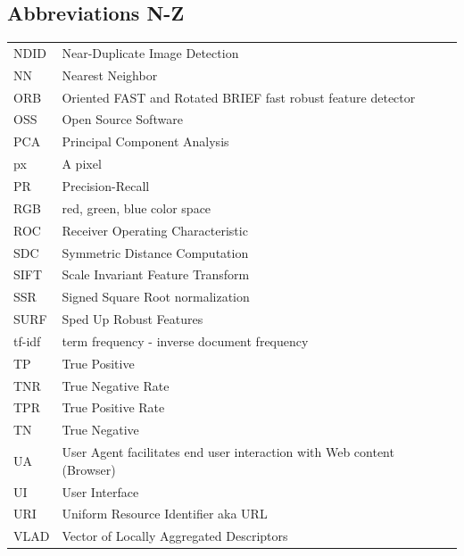 \documentclass[english,12pt,a4paper,pdftex,elec,utf8, table]{aaltothesis}
\begin{document}
\clearpage
\subsection*{Abbreviations N-Z}
\begin{tabular}{ll}
NDID & Near-Duplicate Image Detection\\
  NN & Nearest Neighbor\\
  ORB & Oriented FAST and Rotated BRIEF fast robust feature detector\\
  OSS & Open Source Software\\
  PCA & Principal Component Analysis\\
  px & A pixel  \\
  PR & Precision-Recall\\
  RGB & red, green, blue color space\\
  ROC & Receiver Operating Characteristic\\
  SDC & Symmetric Distance Computation\\
  SIFT & Scale Invariant Feature Transform \\
  SSR & Signed Square Root normalization\\
  SURF & Sped Up Robust Features \\
  tf-idf & term frequency - inverse document frequency\\
  TP & True Positive\\
  TNR & True Negative Rate\\
  TPR & True Positive Rate\\
  TN & True Negative\\
  UA   & User Agent facilitates end user interaction with Web content (Browser)\\
  UI   & User Interface\\
  URI  & Uniform Resource Identifier aka URL\\
  VLAD & Vector of Locally Aggregated Descriptors\\
\end{tabular}
\cleardoublepage
\storeinipagenumber
{}
\setcounter{page}{1}
\end{document}
